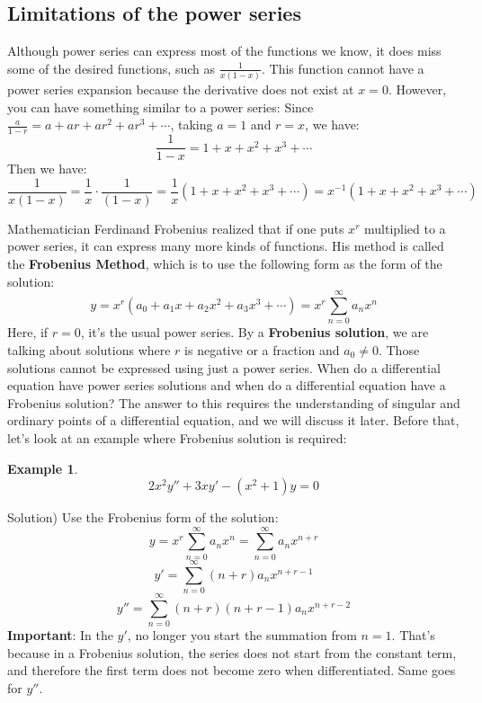 \documentclass[12pt]{report}
\newtheorem{ex}{Example}[section]
\begin{document}
\subsection*{Limitations of the power series}
Although power series can express most of the functions we know, it does miss some of the desired functions, such as $\frac{1}{x(1-x)}$. This function cannot have a power series expansion because the derivative does not exist at $x=0$.
However, you can have something similar to a power series:
Since $\frac{a}{1-r} = a + ar + ar^2 + ar^3 + \cdots$, taking $a=1$ and $r=x$, we have:
$$\frac{1}{1-x} = 1 + x + x^2 + x^3 + \cdots $$
Then we have:
$$\frac{1}{x(1-x)}= \frac{1}{x}\cdot \frac{1}{(1-x)} = \frac{1}{x} ( 1 + x + x^2 + x^3 + \cdots) = x^{-1} ( 1 + x + x^2 + x^3 + \cdots)  $$

Mathematician Ferdinand Frobenius realized that if one puts $x^r$ multiplied to a power series, it can express many more kinds of functions. His method is called the \textbf{Frobenius Method}, which is to use the following form as the form of the solution:
$$y= x^r (a_0 + a_1x + a_2 x^2 + a_3 x^3 + \cdots ) = x^r \sum_{n=0}^{\infty} a_n x^n $$
Here, if $r=0$, it's the usual power series. By a \textbf{Frobenius solution}, we are talking about solutions where $r$ is negative or a fraction and $a_0 \neq 0$. Those solutions cannot be expressed using just a power series. When do a differential equation have power series solutions and when do a differential equation have a Frobenius solution? The answer to this requires the understanding of singular and ordinary points of a differential equation, and we will discuss it later. Before that, let's look at an example where Frobenius solution is required:

\begin{ex}
$$2x^2 y'' + 3xy' - (x^2 +1)y =0$$
\end{ex}
Solution)
Use the Frobenius form of the solution:
$$y = x^r \sum_{n=0}^{\infty} a_n x^n  = \sum_{n=0}^{\infty} a_n x^{n+r}$$
$$y' = \sum_{n=0}^{\infty} (n+r)a_n x^{n+r-1}$$
$$y'' = \sum_{n=0}^{\infty} (n+r)(n+r-1)a_n x^{n+r-2}$$
\textbf{Important}: In the $y'$, no longer you start the summation from $n=1$. That's because in a Frobenius solution, the series does not start from the constant term, and therefore the first term does not become zero when differentiated. Same goes for $y''$.
\end{document}
